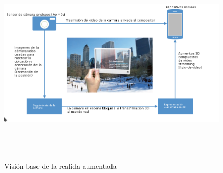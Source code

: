 \vspace{5mm}
\begin{figure}[!htbp]
	\centering
	\includegraphics[width=17cm,height=10cm]{imagenes/marcoteorico/ar/visionAR.png}
	\caption{Visión base de la realida aumentada\cite{B22}}
	\label{fig:analogo}
\end{figure}
